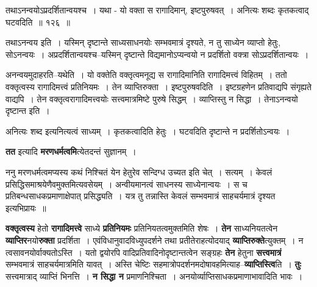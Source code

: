 \documentclass[article,12pt,a4paper]{memoir}
\begin{document}
	  \bigskip
	  \begingroup
	

	  \pstart {}तथाऽनन्वयोऽप्रदर्शितान्वयश्च । यथा - यो वक्ता स रागादिमान्, इष्टपुरुषवत् । अनित्यः शब्दः कृतकत्वाद् घटवदिति ॥ १२६ ॥
	\pend
      
	  \endgroup
	 

	  \pstart तथाऽनन्वय इति । यस्मिन् दृष्टान्ते साध्यसाधनयोः सम्भवमात्रं दृश्यते, न तु साध्येन व्याप्तो हेतुः, सोऽनन्वयः । अप्रदर्शितान्वयश्च--यस्मिन् दृष्टान्ते विद्यमानोऽप्यन्वयो न प्रदर्शितो वक्त्रा सोऽप्रदर्शितान्वयः ।
	\pend
        

	  \pstart अनन्वयमुदाहरति--यथेति । यो वक्तेति वक्तृत्वमनूद्य स रागादिमानिति रागादिमत्त्वं विहितम् । ततो वक्तृत्वस्य रागादिमत्त्वं  प्रतिनियमः । तेन व्याप्तिरुक्ता । इष्टपुरुषवदिति । इष्टग्रहणेन प्रतिवाद्यपि संगृह्यते वाद्यपि । तेन वक्तृत्वरागादिमत्त्वयोः सत्त्वमात्रमिष्टे पुरुषे सिद्धम् । व्याप्तिस्तु न सिद्धा । तेनाऽनन्वयो दृष्टान्त इति ।
	\pend
        

	  \pstart अनित्यः शब्द इत्यनित्यत्वं साध्यम् । कृतकत्वादिति हेतुः । घटवदिति दृष्टान्ते न प्रदर्शितोऽन्वयः ।
	\pend
      
	  \endgroup
	

	  \pstart \textbf{तत} इत्यादि \textbf{मरणधर्मत्वमि}त्येतदन्तं सुज्ञानम् ।
	\pend
      

	  \pstart ननु मरणधर्मत्वमप्यस्य कथं निश्चितं येन हेतुरेव सन्दिग्ध उच्यत इति चेत् । सत्यम् । केवलं प्रसिद्धिसमाश्रयेणैवमुक्तमित्यवसेयम् । अन्वीयमानत्वं साधनस्य साध्येनान्वयः । स च प्रतिबन्धसाधकप्रमाणाक्षेपात् प्रसिद्ध्यति । यत्र तु तन्नास्ति केवलं सम्भवमात्रं साहचर्यमात्रं दृश्यत इत्यभिप्रायः ॥
	\pend
      

	  \pstart \textbf{वक्तृत्वस्य} हेतो \textbf{रागादिमत्त्वे} \leavevmode{} साध्ये \textbf{प्रतिनियमः} प्रतिनियतत्वमुक्तमिति शेषः । \textbf{तेन} साध्यनियतत्वेन \textbf{व्याप्तिर}नयो\textbf{रुक्ता} प्रदर्शिता । एवंविधानुवादविध्युपदर्शने तथा प्रतीतेराहत्योदयाद् \textbf{व्याप्तिरुक्ते}त्युक्तम् । न त्वसावनयोर्वाक्यतोऽस्ति । यतो द्वयोरपि वादिप्रतिवादिनोदृष्टान्तत्वेन सङ्ग्रहः \textbf{तेन} हेतुना \textbf{सत्त्वमात्रं} सम्भवमात्रं साहचर्यमात्रमिति यावत् । अस्ति चेष्टिः सहमात्रोपदर्शनमदोषावहमित्याह--\textbf{व्याप्तिस्त्वि}ति । \textbf{तुः} सत्त्वमात्राद् व्याप्तिं भिनत्ति । \textbf{न सिद्धा न} प्रमाणनिश्चिता । अनयोर्व्याप्तिसाधकप्रमाणाभावादिति भावः ।
	\pend
      
\end{document}
